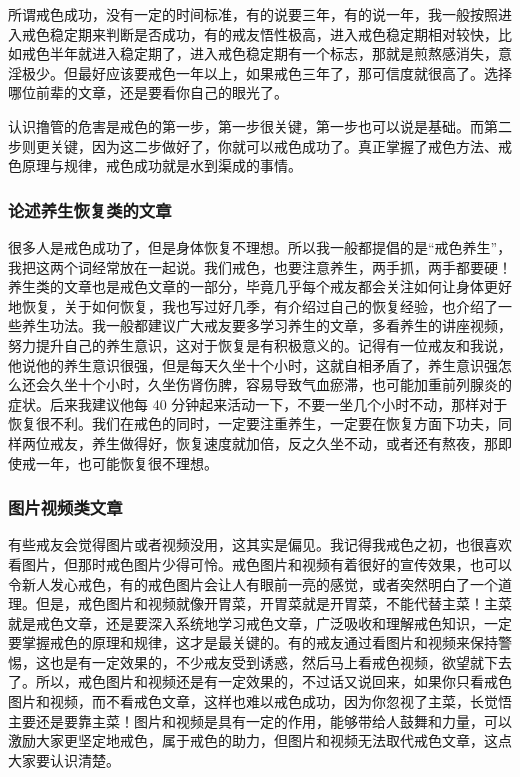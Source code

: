 所谓戒色成功，没有一定的时间标准，有的说要三年，有的说一年，我一般按照进入戒色稳定期来判断是否成功，有的戒友悟性极高，进入戒色稳定期相对较快，比如戒色半年就进入稳定期了，进入戒色稳定期有一个标志，那就是煎熬感消失，意淫极少。但最好应该要戒色一年以上，如果戒色三年了，那可信度就很高了。选择哪位前辈的文章，还是要看你自己的眼光了。

认识撸管的危害是戒色的第一步，第一步很关键，第一步也可以说是基础。而第二步则更关键，因为这二步做好了，你就可以戒色成功了。真正掌握了戒色方法、戒色原理与规律，戒色成功就是水到渠成的事情。

\subsubsection{论述养生恢复类的文章}

很多人是戒色成功了，但是身体恢复不理想。所以我一般都提倡的是“戒色养生”，我把这两个词经常放在一起说。我们戒色，也要注意养生，两手抓，两手都要硬！养生类的文章也是戒色文章的一部分，毕竟几乎每个戒友都会关注如何让身体更好地恢复，关于如何恢复，我也写过好几季，有介绍过自己的恢复经验，也介绍了一些养生功法。我一般都建议广大戒友要多学习养生的文章，多看养生的讲座视频，努力提升自己的养生意识，这对于恢复是有积极意义的。记得有一位戒友和我说，他说他的养生意识很强，但是每天久坐十个小时，这就自相矛盾了，养生意识强怎么还会久坐十个小时，久坐伤肾伤脾，容易导致气血瘀滞，也可能加重前列腺炎的症状。后来我建议他每 40 分钟起来活动一下，不要一坐几个小时不动，那样对于恢复很不利。我们在戒色的同时，一定要注重养生，一定要在恢复方面下功夫，同样两位戒友，养生做得好，恢复速度就加倍，反之久坐不动，或者还有熬夜，那即使戒一年，也可能恢复很不理想。

\subsubsection{图片视频类文章}

有些戒友会觉得图片或者视频没用，这其实是偏见。我记得我戒色之初，也很喜欢看图片，但那时戒色图片少得可怜。戒色图片和视频有着很好的宣传效果，也可以令新人发心戒色，有的戒色图片会让人有眼前一亮的感觉，或者突然明白了一个道理。但是，戒色图片和视频就像开胃菜，开胃菜就是开胃菜，不能代替主菜！主菜就是戒色文章，还是要深入系统地学习戒色文章，广泛吸收和理解戒色知识，一定要掌握戒色的原理和规律，这才是最关键的。有的戒友通过看图片和视频来保持警惕，这也是有一定效果的，不少戒友受到诱惑，然后马上看戒色视频，欲望就下去了。所以，戒色图片和视频还是有一定效果的，不过话又说回来，如果你只看戒色图片和视频，而不看戒色文章，这样也难以戒色成功，因为你忽视了主菜，长觉悟主要还是要靠主菜！图片和视频是具有一定的作用，能够带给人鼓舞和力量，可以激励大家更坚定地戒色，属于戒色的助力，但图片和视频无法取代戒色文章，这点大家要认识清楚。

